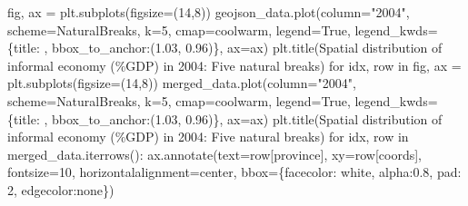 \documentclass[
  letterpaper,
  DIV=11,
  numbers=noendperiod]{scrreprt}
\newenvironment{Shaded}{\begin{snugshade}}{\end{snugshade}}
\newcommand{\ControlFlowTok}[1]{\textcolor[rgb]{0.00,0.23,0.31}{#1}}
\newcommand{\DecValTok}[1]{\textcolor[rgb]{0.68,0.00,0.00}{#1}}
\newcommand{\FloatTok}[1]{\textcolor[rgb]{0.68,0.00,0.00}{#1}}
\newcommand{\KeywordTok}[1]{\textcolor[rgb]{0.00,0.23,0.31}{#1}}
\newcommand{\NormalTok}[1]{\textcolor[rgb]{0.00,0.23,0.31}{#1}}
\newcommand{\OperatorTok}[1]{\textcolor[rgb]{0.37,0.37,0.37}{#1}}
\newcommand{\SpecialCharTok}[1]{\textcolor[rgb]{0.37,0.37,0.37}{#1}}
\newcommand{\StringTok}[1]{\textcolor[rgb]{0.13,0.47,0.30}{#1}}
\newcommand{\VariableTok}[1]{\textcolor[rgb]{0.07,0.07,0.07}{#1}}
\begin{document}
\begin{Shaded}
\begin{Highlighting}[]
\NormalTok{fig, ax }\OperatorTok{=}\NormalTok{ plt.subplots(figsize}\OperatorTok{=}\NormalTok{(}\DecValTok{14}\NormalTok{,}\DecValTok{8}\NormalTok{))}
\NormalTok{geojson\_data.plot(column}\OperatorTok{=}\StringTok{"2004"}\NormalTok{, scheme}\OperatorTok{=}\StringTok{\textquotesingle{}NaturalBreaks\textquotesingle{}}\NormalTok{, k}\OperatorTok{=}\DecValTok{5}\NormalTok{, cmap}\OperatorTok{=}\StringTok{\textquotesingle{}coolwarm\textquotesingle{}}\NormalTok{, legend}\OperatorTok{=}\VariableTok{True}\NormalTok{, legend\_kwds}\OperatorTok{=}\NormalTok{\{}\StringTok{\textquotesingle{}title\textquotesingle{}}\NormalTok{: }\StringTok{\textquotesingle{}\textquotesingle{}}\NormalTok{, }\StringTok{\textquotesingle{}bbox\_to\_anchor\textquotesingle{}}\NormalTok{:(}\FloatTok{1.03}\NormalTok{, }\FloatTok{0.96}\NormalTok{)\}, ax}\OperatorTok{=}\NormalTok{ax)}
\NormalTok{plt.title(}\StringTok{\textquotesingle{}Spatial distribution of  informal economy (}\SpecialCharTok{\%G}\StringTok{DP) in 2004: Five natural breaks\textquotesingle{}}\NormalTok{)}
\ControlFlowTok{for}\NormalTok{ idx, row }\KeywordTok{in}\NormalTok{ fig, ax }\OperatorTok{=}\NormalTok{ plt.subplots(figsize}\OperatorTok{=}\NormalTok{(}\DecValTok{14}\NormalTok{,}\DecValTok{8}\NormalTok{))}
\NormalTok{merged\_data.plot(column}\OperatorTok{=}\StringTok{"2004"}\NormalTok{, scheme}\OperatorTok{=}\StringTok{\textquotesingle{}NaturalBreaks\textquotesingle{}}\NormalTok{, k}\OperatorTok{=}\DecValTok{5}\NormalTok{, cmap}\OperatorTok{=}\StringTok{\textquotesingle{}coolwarm\textquotesingle{}}\NormalTok{, legend}\OperatorTok{=}\VariableTok{True}\NormalTok{, legend\_kwds}\OperatorTok{=}\NormalTok{\{}\StringTok{\textquotesingle{}title\textquotesingle{}}\NormalTok{: }\StringTok{\textquotesingle{}\textquotesingle{}}\NormalTok{, }\StringTok{\textquotesingle{}bbox\_to\_anchor\textquotesingle{}}\NormalTok{:(}\FloatTok{1.03}\NormalTok{, }\FloatTok{0.96}\NormalTok{)\}, ax}\OperatorTok{=}\NormalTok{ax)}
\NormalTok{plt.title(}\StringTok{\textquotesingle{}Spatial distribution of  informal economy (}\SpecialCharTok{\%G}\StringTok{DP) in 2004: Five natural breaks\textquotesingle{}}\NormalTok{)}
\ControlFlowTok{for}\NormalTok{ idx, row }\KeywordTok{in}\NormalTok{ merged\_data.iterrows():}
\NormalTok{    ax.annotate(text}\OperatorTok{=}\NormalTok{row[}\StringTok{\textquotesingle{}province\textquotesingle{}}\NormalTok{], xy}\OperatorTok{=}\NormalTok{row[}\StringTok{\textquotesingle{}coords\textquotesingle{}}\NormalTok{], fontsize}\OperatorTok{=}\DecValTok{10}\NormalTok{,}
\NormalTok{                 horizontalalignment}\OperatorTok{=}\StringTok{\textquotesingle{}center\textquotesingle{}}\NormalTok{, bbox}\OperatorTok{=}\NormalTok{\{}\StringTok{\textquotesingle{}facecolor\textquotesingle{}}\NormalTok{: }\StringTok{\textquotesingle{}white\textquotesingle{}}\NormalTok{, }\StringTok{\textquotesingle{}alpha\textquotesingle{}}\NormalTok{:}\FloatTok{0.8}\NormalTok{, }\StringTok{\textquotesingle{}pad\textquotesingle{}}\NormalTok{: }\DecValTok{2}\NormalTok{, }\StringTok{\textquotesingle{}edgecolor\textquotesingle{}}\NormalTok{:}\StringTok{\textquotesingle{}none\textquotesingle{}}\NormalTok{\})}



\end{Highlighting}
\end{Shaded}
\end{document}
